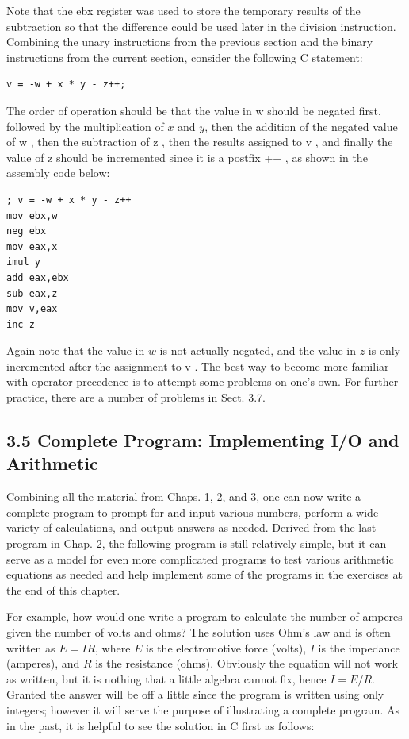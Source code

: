 \documentclass[10pt]{article}
\begin{document}
Note that the ebx register was used to store the temporary results of the subtraction so that the difference could be used later in the division instruction. Combining the unary instructions from the previous section and the binary instructions from the current section, consider the following C statement:

\begin{verbatim}
v = -w + x * y - z++;
\end{verbatim}

The order of operation should be that the value in w should be negated first, followed by the multiplication of $x$ and $y$, then the addition of the negated value of w , then the subtraction of z , then the results assigned to v , and finally the value of z should be incremented since it is a postfix ++ , as shown in the assembly code below:

\begin{verbatim}
; v = -w + x * y - z++
mov ebx,w
neg ebx
mov eax,x
imul y
add eax,ebx
sub eax,z
mov v,eax
inc z
\end{verbatim}

Again note that the value in $w$ is not actually negated, and the value in $z$ is only incremented after the assignment to v . The best way to become more familiar with operator precedence is to attempt some problems on one's own. For further practice, there are a number of problems in Sect. 3.7.

\subsection*{3.5 Complete Program: Implementing I/O and Arithmetic}
Combining all the material from Chaps. 1, 2, and 3, one can now write a complete program to prompt for and input various numbers, perform a wide variety of calculations, and output answers as needed. Derived from the last program in Chap. 2, the following program is still relatively simple, but it can serve as a model for even more complicated programs to test various arithmetic equations as needed and help implement some of the programs in the exercises at the end of this chapter.

For example, how would one write a program to calculate the number of amperes given the number of volts and ohms? The solution uses Ohm's law and is often written as $E=I R$, where $E$ is the electromotive force (volts), $I$ is the impedance (amperes), and $R$ is the resistance (ohms). Obviously the equation will not work as written, but it is nothing that a little algebra cannot fix, hence $I=E / R$. Granted the answer will be off a little since the program is written using only integers; however it will serve the purpose of illustrating a complete program. As in the past, it is helpful to see the solution in C first as follows:
\end{document}
